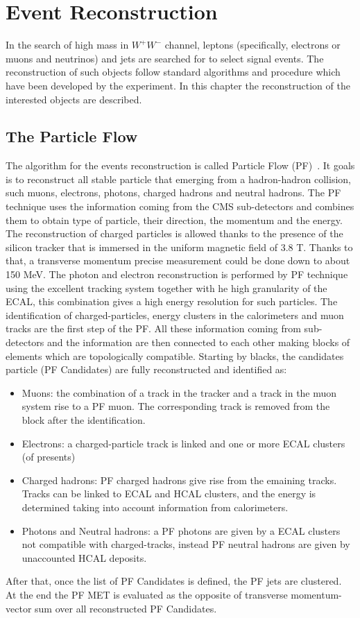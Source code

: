 \chapter{Event Reconstruction}
\label{cap4}
In the search of high mass in $W^+W^-$ channel, leptons (specifically, electrons or muons and neutrinos) and jets are searched for to select signal events.
The reconstruction of such objects follow standard algorithms and procedure which have been
developed by the experiment. In this chapter the reconstruction of the interested objects are described.

\section{The Particle Flow}
\label{PFt}
The algorithm for the events reconstruction is called Particle Flow (PF)~\cite{CMS-PAS-PFT-09-001}. It goals is to reconstruct all stable particle that emerging from a hadron-hadron collision, such muons, electrons, photons, charged hadrons and neutral hadrons. The PF technique uses the information coming from the 
CMS sub-detectors and combines them to obtain type of particle, their direction, the momentum and the energy.
The reconstruction of charged particles is allowed thanks to the presence of the silicon tracker that is immersed in the uniform magnetic field of 3.8 T. 
Thanks to that, a transverse momentum precise measurement could be done down to about 150 MeV.
The photon and electron reconstruction is performed by PF technique using the excellent tracking system together with he high granularity of the ECAL, this combination gives a high energy resolution for such particles.
The identification of charged-particles, energy clusters in the  calorimeters and muon tracks are the first step of the PF. All these information coming from sub-detectors and the information are then connected to each other making blocks of elements which are topologically compatible.
Starting by blacks, the candidates particle (PF Candidates) are fully reconstructed and identified as:
\begin{itemize}
\item Muons: the combination of a track in the tracker and a track in the muon system rise to a PF muon. The corresponding track is removed from the block after the identification.
\item Electrons: a charged-particle track is linked and one or more ECAL clusters (of presents)
\item Charged hadrons: PF charged hadrons give rise from the emaining tracks. Tracks can
be linked to ECAL and HCAL clusters, and the energy is determined taking into
account information from calorimeters.
\item Photons and Neutral hadrons:  a PF photons are given by a ECAL clusters not compatible with charged-tracks, instead PF
neutral hadrons are given by unaccounted HCAL deposits.
\end{itemize}
After that, once the list of PF Candidates is defined, the PF jets are clustered. At the end the PF MET is evaluated as the  opposite of transverse momentum-vector sum over all reconstructed PF Candidates.

